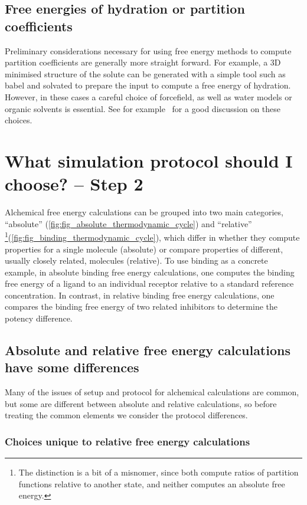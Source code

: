 \documentclass[9pt,bestpractices]{livecoms}
\begin{document}
\subsection{Free energies of hydration or partition coefficients}
\label{subsec:hydration}
Preliminary considerations necessary for using free energy methods to compute partition coefficients are generally more straight forward. For example, a 3D minimised structure of the solute can be generated with a simple tool such as babel and solvated to prepare the input  to compute a free energy of hydration. However, in these cases a careful choice of forcefield, as well as water models or organic solvents is essential. See for example~\cite{bosisio2016blinded,rustenburg2016measuring} for a good discussion on these choices. 
%
%
%
%
\section{What simulation protocol should I choose? -- Step 2}
\label{sec:step2}
Alchemical free energy calculations can be grouped into two main categories, ``absolute'' (\ref{fig:fig_absolute_thermodynamic_cycle}) and ``relative'' \footnote{The distinction is a bit of a misnomer, since both compute ratios of partition functions relative to another state, and neither computes an absolute free energy.}(\ref{fig:fig_binding_thermodynamic_cycle}), which differ in whether they compute properties for a single molecule (absolute) or compare properties of different, usually closely related, molecules (relative).
To use binding as a concrete example, in absolute binding free energy calculations, one computes the binding free energy of a ligand to an individual receptor relative to a standard reference concentration.
In contrast, in relative binding free energy calculations, one compares the binding free energy of two related inhibitors to determine the potency difference.
\subsection{Absolute and relative free energy calculations have some differences}
Many of the issues of setup and protocol for alchemical calculations are common, but some are different between absolute and relative calculations, so before treating the common elements we consider the protocol differences.

\subsubsection{Choices unique to relative free energy calculations}
\label{sec:relative-fe-protocol}
\end{document}
